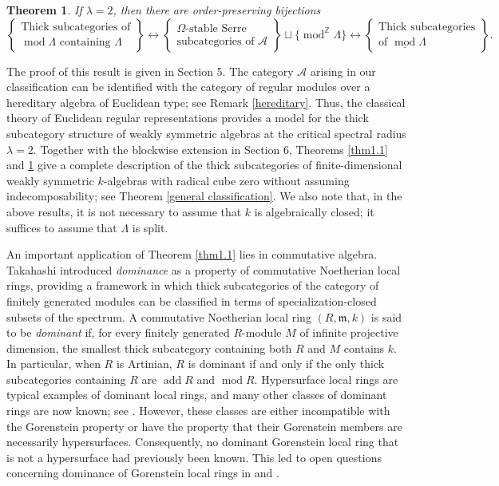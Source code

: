 \documentclass{amsart}
\newtheorem{thm}{Theorem}[section]
\theoremstyle{definition}
\theoremstyle{remark}
\numberwithin{equation}{thm}
\def\A{\mathcal{A}}
\def\add{\operatorname{add}}
\def\gmod{\operatorname{mod}^{\mathbb{Z}}\!}
\def\L{\Lambda}
\def\m{\mathfrak{m}}
\def\mod{\operatorname{mod}}
\begin{document}
\begin{thm}\label{thm1.2}
If $\lambda=2$, then there are order-preserving bijections
$$
\left\{
\begin{matrix}
\text{Thick subcategories of}\\
\text{$\mod\L$ containing $\L$}
\end{matrix}
\right\}
\longleftrightarrow
\left\{
\begin{matrix}
\text{$\Omega$-stable Serre}\\
\text{subcategories of $\A$} 
\end{matrix}
\right\}\sqcup\{\gmod\L\}
\longleftrightarrow
\left\{
\begin{matrix}
\text{Thick subcategories}\\
\text{of $\underline{\mod}\L$}
\end{matrix}
\right\}.
$$
\end{thm}

\noindent The proof of this result is given in Section 5. The category $\A$ arising in our classification can be identified with the category of regular modules over a hereditary algebra of Euclidean type; see Remark \ref{hereditary}. Thus, the classical theory of Euclidean regular representations provides a model for the thick subcategory structure of weakly symmetric algebras at the critical spectral radius $\lambda=2$.
Together with the blockwise extension in Section 6, Theorems \ref{thm1.1} and \ref{thm1.2} give a complete description of the thick subcategories of finite-dimensional weakly symmetric $k$-algebras with radical cube zero without assuming indecomposability; see Theorem \ref{general classification}.
We also note that, in the above results, it is not necessary to assume that $k$ is algebraically closed; it suffices to assume that $\L$ is split.

An important application of Theorem \ref{thm1.1} lies in commutative algebra.
Takahashi \cite{T23} introduced \textit{dominance} as a property of commutative Noetherian local rings, providing a framework in which thick subcategories of the category of finitely generated modules can be classified in terms of specialization-closed subsets of the spectrum.
A commutative Noetherian local ring $(R,\m,k)$ is said to be \textit{dominant} if, for every finitely generated $R$-module $M$ of infinite projective dimension, the smallest thick subcategory containing both $R$ and $M$ contains $k$.
In particular, when $R$ is Artinian, $R$ is dominant if and only if the only thick subcategories containing $R$ are $\add R$ and $\mod R$.
Hypersurface local rings are typical examples of dominant local rings, and many other classes of dominant rings are now known; see \cite{KT, T23}.
However, these classes are either incompatible with the Gorenstein property or have the property that their Gorenstein members are necessarily hypersurfaces.
Consequently, no dominant Gorenstein local ring that is not a hypersurface had previously been known.
This led to open questions concerning dominance of Gorenstein local rings in \cite[Question 9.6]{T23} and \cite[Question 7.1]{KT}.
\end{document}
